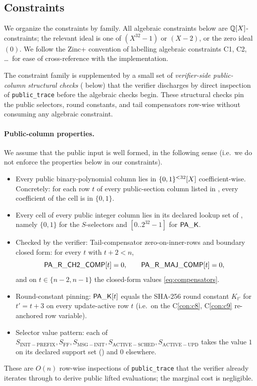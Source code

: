 \subsection{Constraints}\label{sec:constraints}

We organize the constraints by family. All algebraic constraints below
are $\mathbb{Q}[X]$-constraints; the relevant ideal is one of $(X^{32}-1)$ or
$(X-2)$, or the zero ideal $(0)$. We follow the Zinc+ convention of
labelling algebraic constraints C1, C2, \dots\ for ease of
cross-reference with the implementation.

The constraint family is supplemented by a small set of
\emph{verifier-side public-column structural checks}
( below) that the verifier discharges by
direct inspection of \texttt{public\_trace} before the algebraic
checks begin. These structural checks pin the public selectors,
round constants, and tail compensators row-wise without consuming
any algebraic constraint.

\label{cons:public-checks}
\paragraph{Public-column properties.}

We assume that the public input is well formed, in the following sense (i.e.\ we do not enforce the properties below in our constraints).
\begin{itemize}[leftmargin=2em]
  \item Every public binary-polynomial column lies in $\{0,1\}^{<32}[X]$
    coefficient-wise. Concretely: for each row $t$ of every
    public-section column listed in , every
    coefficient of the cell is in $\{0,1\}$.
  \item Every cell of every public integer column lies in its
    declared lookup set of , namely
    $\{0,1\}$ for the $S$-selectors and $[0..2^{32}-1]$ for
    $\mathsf{PA\_K}$.
  \item Checked by the verifier: Tail-compensator zero-on-inner-rows and boundary closed form:
    for every $t$ with $t+2 < n$,
    \[
      \mathsf{PA\_R\_CH2\_COMP}[t] = 0,
      \qquad
      \mathsf{PA\_R\_MAJ\_COMP}[t] = 0,
    \]
    and on $t \in \{n-2, n-1\}$ the closed-form values \eqref{eq:compensators}.
  \item Round-constant pinning: $\mathsf{PA\_K}[t]$ equals the
    SHA-256 round constant $K_{t'}$ for $t' = t + 3$ on every
    update-active row $t$ (i.e.\ on the C\ref{con:c8}, C\ref{con:c9}
    re-anchored row variable).
  \item Selector value pattern: each of $S_{\mathrm{INIT-PREFIX}},
    S_{\mathrm{FF}}, S_{\mathrm{MSG-INIT}},
    S_{\mathrm{ACTIVE-SCHED}}, S_{\mathrm{ACTIVE-UPD}}$ takes the
    value $1$ on its declared support set () and
    $0$ elsewhere.
\end{itemize}
These are $O(n)$ row-wise inspections of \texttt{public\_trace} that
the verifier already iterates through to derive public lifted
evaluations; the marginal cost is negligible.

